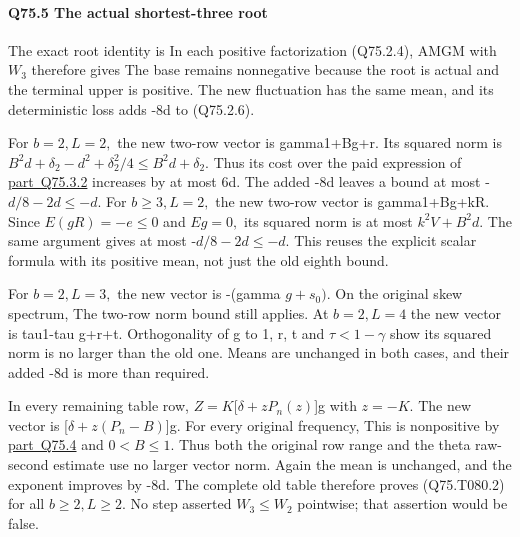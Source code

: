 \paragraph{Q75.5 The actual shortest-three root}\label{part:Q75.5}

The exact root identity is
In each positive factorization (Q75.2.4), AMGM with \(W_3\) therefore gives
The base remains nonnegative because the root is actual and the
terminal upper is positive. The new fluctuation has the same mean,
and its deterministic loss adds -8d to (Q75.2.6).

For \(b=2,\allowbreak  L=2,\allowbreak \) the new two-row vector is gamma1+Bg+r. Its squared norm
is \(B^2d+\delta_2-d^2+\delta_2^2/4\le B^2d+\delta_2.\) Thus its cost over the paid expression
of \mbox{\hyperref[part:Q75.3.2]{part Q75.3.2}} increases by at most 6d. The added -8d leaves a bound
at most -\(d/8-2d\le -d.\)
For \(b\ge 3,\allowbreak  L=2,\allowbreak \) the new two-row vector is gamma1+Bg+kR. Since
\(E(gR)=-e\le 0\) and \(Eg=0,\allowbreak \) its squared norm is at most \(k^2V+B^2d.\)
The same argument gives at most -\(d/8-2d\le -d.\) This reuses the explicit
scalar formula with its positive mean, not just the old eighth bound.

For \(b=2,\allowbreak  L=3,\allowbreak \) the new vector is -(gamma \(g+s_0).\) On the original
skew spectrum,
The two-row norm bound still applies. At \(b=2,\allowbreak  L=4\) the new vector is
tau1-tau g+r+t. Orthogonality of g to 1, r, t and \(\tau<1-\gamma\) show
its squared norm is no larger than the old one. Means are unchanged
in both cases, and their added -8d is more than required.

In every remaining table row, \(Z=K\)[\(\delta+zP_n(z)\)]g with \(z=-K.\)
The new vector is [\(\delta+z(P_n-B)\)]g. For every original frequency,
This is nonpositive by \mbox{\hyperref[part:Q75.4]{part Q75.4}} and \(0<B\le 1.\) Thus both the original
row range and the theta raw-second estimate use no larger vector
norm. Again the mean is unchanged, and the exponent improves by -8d.
The complete old table therefore proves (Q75.T080.2) for all \(b\ge 2,\allowbreak  L\ge 2.\)
No step asserted \(W_3\le W_2\) pointwise; that assertion would be false.

